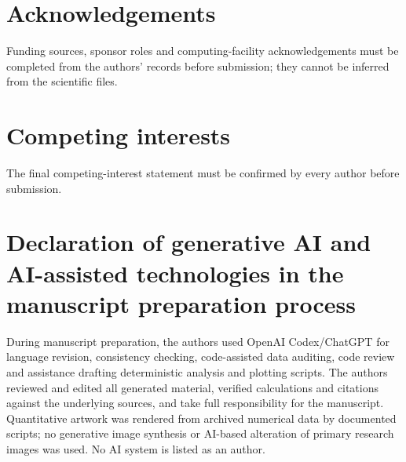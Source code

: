 \documentclass[11pt]{article}
\begin{document}
\section*{Acknowledgements}
Funding sources, sponsor roles and computing-facility acknowledgements must be completed from the authors'
records before submission; they cannot be inferred from the scientific files.

\section*{Competing interests}
The final competing-interest statement must be confirmed by every author before submission.

\section*{Declaration of generative AI and AI-assisted technologies in the manuscript preparation process}
During manuscript preparation, the authors used OpenAI Codex/ChatGPT for language revision, consistency
checking, code-assisted data auditing, code review and assistance drafting deterministic analysis and plotting
scripts. The authors reviewed and edited all generated material, verified calculations and citations against
the underlying sources, and take full responsibility for the manuscript. Quantitative artwork was rendered
from archived numerical data by documented scripts; no generative image synthesis or AI-based alteration of
primary research images was used. No AI system is listed as an author.



\end{document}
